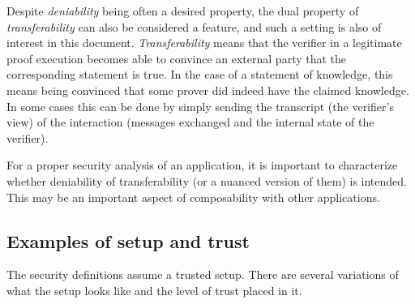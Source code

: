 	Despite \emph{deniability} being often a desired property, the dual property of \emph{transferability} can also be considered a feature, and such a setting is also of interest in this document. 
	\emph{Transferability} means that the verifier in a legitimate proof execution becomes able to convince an external party that the corresponding statement is true. 
	In the case of a statement of knowledge, this means being convinced that some prover did indeed have the claimed knowledge.
	In some cases this can be done by simply sending the transcript (the verifier's view) of the interaction (messages exchanged and the internal state of the verifier).

	For a proper security analysis of an application, it is important to characterize whether deniability of transferability (or a nuanced version of them) is intended.
	This may be an important aspect of composability with other applications.





\subsection{Examples of setup and trust}
\label{sec:security:defs-props:examples-of-setup-and-trust}

The security definitions assume a trusted setup. There are several variations of what the setup looks like and the level of trust placed in it.

